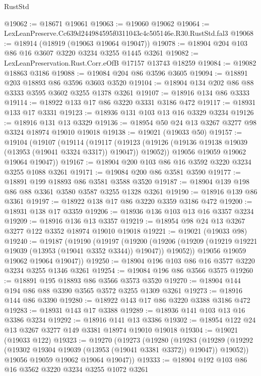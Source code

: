 \begin{lexlean}{RustStd}
\begin{coremodule}
@19062 := @18671 @19061
@19063 := @19060 @19062
@19064 := LexLeanPreserve.Cc639d244984595f0311043c4c505146e.R30.RustStd.fal3
@19068 := @18914 (@18919 (@19063 @19064 @19047))
@19078 := @18904 @204 @103 @86 @16 @3607 @3220 @3234 @3255 @1445 @3261
@19082 := LexLeanPreservation.Rust.Corr.eOfB @17157 @13743 @18259
@19084 := @19082 @18863 @3186
@19088 := @19084 @204 @86 @3596 @3605
@19094 := @18891 @203 @18893 @86 @3596 @3603 @3520
@19104 := @18904 @134 @202 @86 @88 @3333 @3595 @3602 @3255 @1378 @3261
@19107 := @18916 @134 @86 @3333
@19114 := @18922 @133 @17 @86 @3220 @3331 @3186 @472
@19117 := @18931 @133 @17 @3331
@19123 := @18936 @131 @103 @13 @16 @3329 @3234
@19126 := @18916 @131 @13 @3329
@19136 := @18954 @50 @24 @13 @3267 @3277 @98 @3324 @18974 @19010 @19018
@19138 := @19021 (@19033 @50)
@19157 := @19104
    (@19107
      (@19114
        (@19117
          (@19123 (@19126 (@19136 @19138 @19039 (@13953 (@19041 @3324 @3317)) @19047)) @19052))
        @19056
        @19059
        @19062
        @19064
        @19047))
@19167 := @18904 @200 @103 @86 @16 @3592 @3220 @3234 @3255 @1088 @3261
@19171 := @19084 @200 @86 @3581 @3590
@19177 := @18891 @199 @18893 @86 @3581 @3588 @3520
@19187 := @18904 @139 @198 @86 @88 @3361 @3580 @3587 @3255 @1328 @3261
@19190 := @18916 @139 @86 @3361
@19197 := @18922 @138 @17 @86 @3220 @3359 @3186 @472
@19200 := @18931 @138 @17 @3359
@19206 := @18936 @136 @103 @13 @16 @3357 @3234
@19209 := @18916 @136 @13 @3357
@19219 := @18954 @98 @24 @13 @3267 @3277 @122 @3352 @18974 @19010 @19018
@19221 := @19021 (@19033 @98)
@19240 := @19187
    (@19190
      (@19197
        (@19200
          (@19206 (@19209 (@19219 @19221 @19039 (@13953 (@19041 @3352 @3344)) @19047)) @19052))
        @19056
        @19059
        @19062
        @19064
        @19047))
@19250 := @18904 @196 @103 @86 @16 @3577 @3220 @3234 @3255 @1346 @3261
@19254 := @19084 @196 @86 @3566 @3575
@19260 := @18891 @195 @18893 @86 @3566 @3573 @3520
@19270 := @18904 @144 @194 @86 @88 @3390 @3565 @3572 @3255 @1309 @3261
@19273 := @18916 @144 @86 @3390
@19280 := @18922 @143 @17 @86 @3220 @3388 @3186 @472
@19283 := @18931 @143 @17 @3388
@19289 := @18936 @141 @103 @13 @16 @3386 @3234
@19292 := @18916 @141 @13 @3386
@19302 := @18954 @122 @24 @13 @3267 @3277 @149 @3381 @18974 @19010 @19018
@19304 := @19021 (@19033 @122)
@19323 := @19270
    (@19273
      (@19280
        (@19283
          (@19289 (@19292 (@19302 @19304 @19039 (@13953 (@19041 @3381 @3372)) @19047)) @19052))
        @19056
        @19059
        @19062
        @19064
        @19047))
@19333 := @18904 @192 @103 @86 @16 @3562 @3220 @3234 @3255 @1072 @3261

\end{coremodule}
\end{lexlean}
